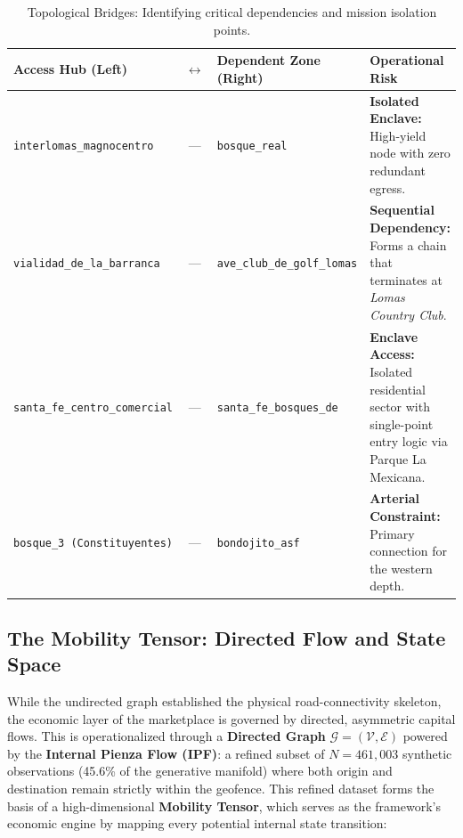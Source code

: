 \begin{table}[H]
    \centering
    \small
    \begin{tabularx}{\textwidth}{l c l X}
        \toprule
        \textbf{Access Hub (Left)} & $\longleftrightarrow$ & \textbf{Dependent Zone (Right)} & \textbf{Operational Risk} \\
        \midrule
        \texttt{interlomas\_magnocentro} & --- & \texttt{bosque\_real} & \textbf{Isolated Enclave:} High-yield node with zero redundant egress. \\
        \addlinespace
        \texttt{vialidad\_de\_la\_barranca} & --- & \texttt{ave\_club\_de\_golf\_lomas} & \textbf{Sequential Dependency:} Forms a chain that terminates at \textit{Lomas Country Club}. \\
        \addlinespace
        \texttt{santa\_fe\_centro\_comercial} & --- & \texttt{santa\_fe\_bosques\_de} & \textbf{Enclave Access:} Isolated residential sector with single-point entry logic via Parque La Mexicana. \\
        \addlinespace
        \texttt{bosque\_3 (Constituyentes)} & --- & \texttt{bondojito\_asf} & \textbf{Arterial Constraint:} Primary connection for the western depth. \\
        \bottomrule
    \end{tabularx}
    \caption{Topological Bridges: Identifying critical dependencies and mission isolation points.}
    \label{tab:topological_bridges}
\end{table}




\subsection{The Mobility Tensor: Directed Flow and State Space}

While the undirected graph established the physical road-connectivity skeleton, the economic layer of the marketplace is governed by directed, asymmetric capital flows. This is operationalized through a \textbf{Directed Graph} $\mathcal{G} = (\mathcal{V}, \mathcal{E})$ powered by the \textbf{Internal Pienza Flow (IPF)}: a refined subset of $N = 461,003$ synthetic observations (45.6\% of the generative manifold) where both origin and destination remain strictly within the geofence. This refined dataset forms the basis of a high-dimensional \textbf{Mobility Tensor}, which serves as the framework's economic engine by mapping every potential internal state transition:

